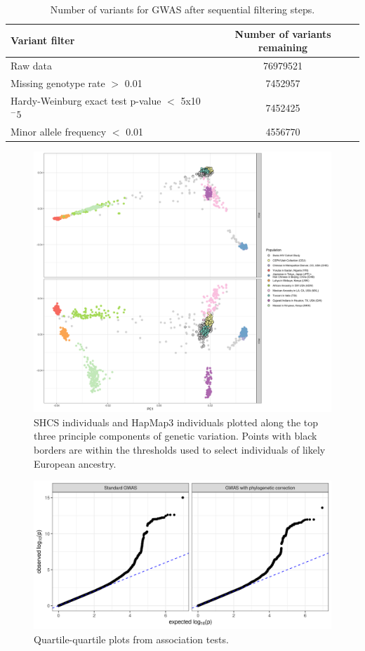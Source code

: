 \documentclass[]{article}
\begin{document}
\begin{doublespace}
\begin{table}[H]
	\begin{center}
		\begin{tabular}{lc}
			\hline
			Variant filter & Number of variants remaining \\
			\hline 
			Raw data & 76979521 \\
			Missing genotype rate $>$ 0.01 & 7452957 \\
			Hardy-Weinburg exact test p-value $<$ 5x10$^-5$ & 7452425 \\
			Minor allele frequency $<$ 0.01 & 4556770 \\ \hline			
		\end{tabular}
		\caption{Number of variants for GWAS after sequential filtering steps.}
		\label{tab:variant-filtering}
	\end{center}
\end{table}

\begin{figure}[H]
	\includegraphics[width=\linewidth]{figures/host_genotype_pca.png}
	\caption{SHCS individuals and HapMap3 individuals plotted along the top three principle components of genetic variation. Points with black borders are within the thresholds used to select individuals of likely European ancestry.}
	\label{fig:PCA}
\end{figure}

\begin{figure}[H]
	\centering
	\includegraphics[width=0.75\linewidth]{figures_archived/200207_qq_plots.png}
	\caption{Quartile-quartile plots from association tests.}
	\label{fig:qq-plots}
\end{figure}


\end{doublespace}
\end{document}
